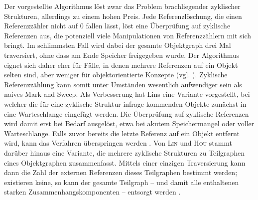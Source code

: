 Der vorgestellte Algorithmus löst zwar das Problem brachliegender zyklischer Strukturen, allerdings zu einem hohen Preis.
Jede Referenzlöschung, die einen Referenzzähler nicht auf $0$ fallen lässt, löst eine Überprüfung auf zyklische Referenzen aus, die potenziell viele Manipulationen von Referenzzählern mit sich bringt.
Im schlimmsten Fall wird dabei der gesamte Objektgraph drei Mal traversiert, ohne dass am Ende Speicher freigegeben wurde.
Der Algorithmus eignet sich daher eher für Fälle, in denen mehrere Referenzen auf ein Objekt selten sind, aber weniger für objektorientierte Konzepte (vgl. \cite[S. 215]{lins1992}).
Zyklische Referenzzählung kann somit unter Umständen wesentlich aufwendiger sein als naives Mark and Sweep.
Als Verbesserung hat Lins eine Variante vorgestellt, bei welcher die für eine zyklische Struktur infrage kommenden Objekte zunächst in eine Warteschlange eingefügt werden.
Die Überprüfung auf zyklische Referenzen wird damit erst bei Bedarf ausgelöst, etwa bei akutem Speichermangel oder voller Warteschlange.
Falls zuvor bereits die letzte Referenz auf ein Objekt entfernt wird, kann das Verfahren überspringen werden \cite{lins1992}.
Von \textsc{Lin} und \textsc{Hou} stammt darüber hinaus eine Variante, die mehrere zyklische Strukturen zu Teilgraphen eines Objektgraphen zusammenfasst.
Mittels einer einzigen Traversierung kann dann die Zahl der externen Referenzen dieses Teilgraphen bestimmt werden; existieren keine, so kann der gesamte Teilgraph -- und damit alle enthaltenen starken Zusammenhangskomponenten -- entsorgt werden \cite{linhou2006}.




